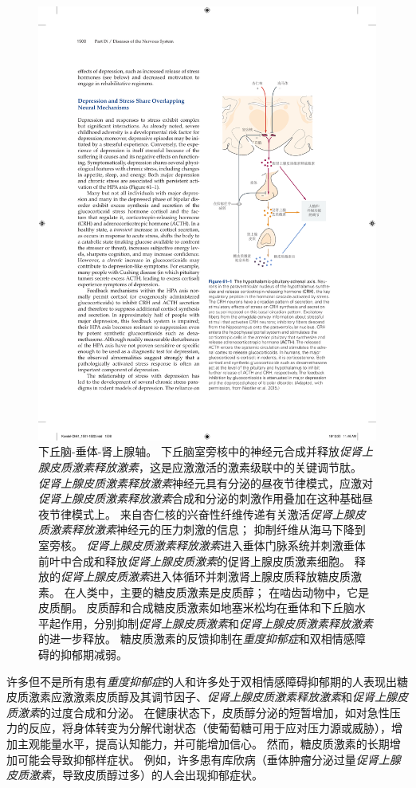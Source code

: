 \begin{figure}[htbp]
	\centering
	\includegraphics[width=0.6\linewidth]{chap61/fig_61_1}
	\caption{下丘脑-垂体-肾上腺轴。
		下丘脑室旁核中的神经元合成并释放\textit{促肾上腺皮质激素释放激素}，这是应激激活的激素级联中的关键调节肽。
		\textit{促肾上腺皮质激素释放激素}神经元具有分泌的昼夜节律模式，应激对\textit{促肾上腺皮质激素释放激素}合成和分泌的刺激作用叠加在这种基础昼夜节律模式上。
		来自杏仁核的兴奋性纤维传递有关激活\textit{促肾上腺皮质激素释放激素}神经元的压力刺激的信息；
		抑制纤维从海马下降到室旁核。
		\textit{促肾上腺皮质激素释放激素}进入垂体门脉系统并刺激垂体前叶中合成和释放\textit{促肾上腺皮质激素}的促肾上腺皮质激素细胞。
		释放的\textit{促肾上腺皮质激素}进入体循环并刺激肾上腺皮质释放糖皮质激素。
		在人类中，主要的糖皮质激素是皮质醇；
		在啮齿动物中，它是皮质酮。
		皮质醇和合成糖皮质激素如地塞米松均在垂体和下丘脑水平起作用，分别抑制\textit{促肾上腺皮质激素}和\textit{促肾上腺皮质激素释放激素}的进一步释放。
		糖皮质激素的反馈抑制在\textit{重度抑郁症}和双相情感障碍的抑郁期减弱\cite{nestler2020nestler}。}
	\label{fig:61_1}
\end{figure}


许多但不是所有患有\textit{重度抑郁症}的人和许多处于双相情感障碍抑郁期的人表现出糖皮质激素应激激素皮质醇及其调节因子、\textit{促肾上腺皮质激素释放激素}和\textit{促肾上腺皮质激素}的过度合成和分泌。
在健康状态下，皮质醇分泌的短暂增加，如对急性压力的反应，将身体转变为分解代谢状态（使葡萄糖可用于应对压力源或威胁），增加主观能量水平，提高认知能力，并可能增加信心。
然而，糖皮质激素的长期增加可能会导致抑郁样症状。
例如，许多患有库欣病（垂体肿瘤分泌过量\textit{促肾上腺皮质激素}，导致皮质醇过多）的人会出现抑郁症状。


